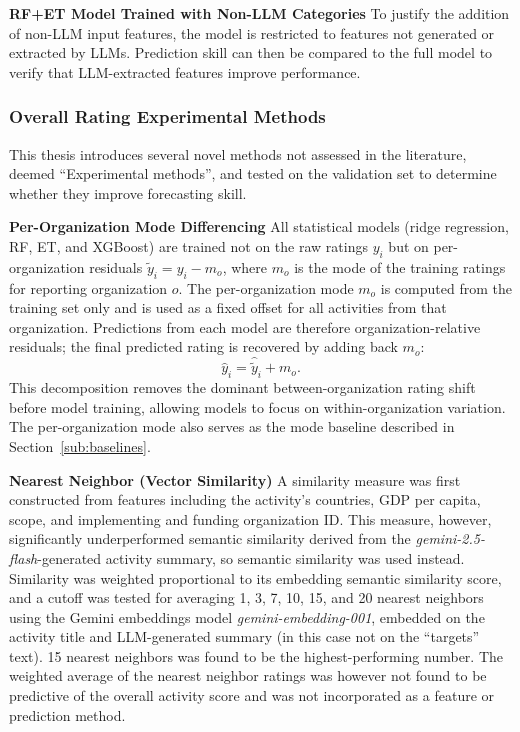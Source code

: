 \documentclass[12pt,a4paper]{article}
\begin{document}
\textbf{RF+ET Model Trained with Non-LLM Categories}
To justify the addition of non-LLM input features, the model is restricted to features not generated or extracted by LLMs. Prediction skill can then be compared to the full model to verify that LLM-extracted features improve performance.

\subsubsection{Overall Rating Experimental Methods}

This thesis introduces several novel methods not assessed in the literature, deemed ``Experimental methods'', and tested on the validation set to determine whether they improve forecasting skill.

\textbf{Per-Organization Mode Differencing}
All statistical models (ridge regression, RF, ET, and XGBoost) are trained not on the raw ratings $y_i$ but on per-organization residuals $\tilde{y}_i = y_i - m_o$, where $m_o$ is the mode of the training ratings for reporting organization $o$. The per-organization mode $m_o$ is computed from the training set only and is used as a fixed offset for all activities from that organization. Predictions from each model are therefore organization-relative residuals; the final predicted rating is recovered by adding back $m_o$:
\[
\hat{y}_i = \hat{\tilde{y}}_i + m_o .
\]
This decomposition removes the dominant between-organization rating shift before model training, allowing models to focus on within-organization variation. The per-organization mode also serves as the mode baseline described in Section~\ref{sub:baselines}.

\textbf{Nearest Neighbor (Vector Similarity)} \label{ssub:nearest_neighbor_vector_similarity}
A similarity measure was first constructed from features including the activity's countries, GDP per capita, scope, and implementing and funding organization ID.
This measure, however, significantly underperformed semantic similarity derived from the \emph{gemini-2.5-flash}-generated activity summary, so semantic similarity was used instead.
Similarity was weighted proportional to its embedding semantic similarity score, and a cutoff was tested for averaging 1, 3, 7, 10, 15, and 20 nearest neighbors using the Gemini embeddings model \emph{gemini-embedding-001}, embedded on the activity title and LLM-generated summary (in this case not on the ``targets'' text). 15 nearest neighbors was found to be the highest-performing number. The weighted average of the nearest neighbor ratings was however not found to be predictive of the overall activity score and was not incorporated as a feature or prediction method.
\end{document}
